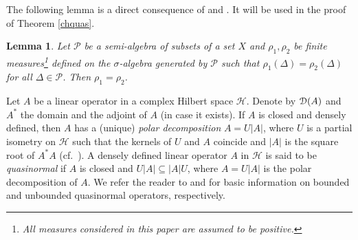 \documentclass[draft,reqno]{amsproc}
\numberwithin{equation}{section}
\newtheorem{lem}[thm]{Lemma}
\theoremstyle{remark}
\theoremstyle{definition}
\begin{document}
The following lemma is a direct consequence of
\cite[Proposition I-6-1]{Nev} and \cite[Theorem
1.3.10]{Ash}. It will be used in the proof of Theorem
\ref{chquas}.
   \begin{lem} \label{2miary}
Let ${{\mathscr P}}$ be a semi-algebra of subsets of a set $X$
and $\rho_1, \rho_2$ be finite measures\footnote{\;All
measures considered in this paper are assumed to be
positive.} defined on the $\sigma$-algebra generated
by ${{\mathscr P}}$ such that $\rho_1(\varDelta) =
\rho_2(\varDelta)$ for all $\varDelta \in {{\mathscr P}}$. Then
$\rho_1 = \rho_2$.
   \end{lem}
Let $A$ be a linear operator in a complex Hilbert
space ${\mathcal H}$. Denote by ${{\EuScript D}({A})}$ and $A^*$ the domain
and the adjoint of $A$ (in case it exists). If $A$ is
closed and densely defined, then $A$ has a (unique)
{\em polar decomposition} $A=U|A|$, where $U$ is a
partial isometry on ${\mathcal H}$ such that the kernels of $U$
and $A$ coincide and $|A|$ is the square root of
$A^*A$ (cf.\ \cite[Section 8.1]{b-s}). A densely
defined linear operator $A$ in ${\mathcal H}$ is said to be
{\em quasinormal} if $A$ is closed and $U |A|
\subseteq |A|U$, where $A=U|A|$ is the polar
decomposition of $A$. We refer the reader to
\cite{bro} and \cite{StSz2} for basic information on
bounded and unbounded quasinormal operators,
respectively.
\end{document}
